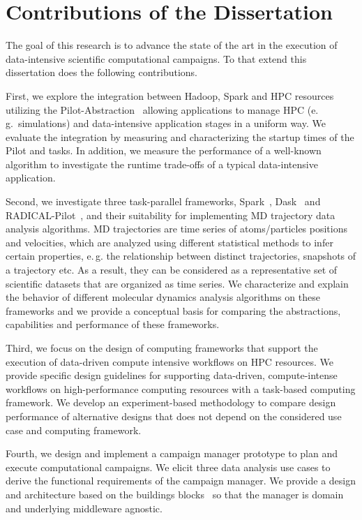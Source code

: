 \section{Contributions of the Dissertation}
The goal of this research is to advance the state of the art in the execution of data-intensive scientific computational campaigns.
To that extend this dissertation does the following contributions.

First, we explore the integration between Hadoop, Spark and HPC resources utilizing the Pilot-Abstraction~\cite{luckow2012pstar} allowing applications to manage HPC (e.\,g.\ simulations) and data-intensive application stages in a uniform way.
We evaluate the integration by measuring and characterizing the startup times of the Pilot and tasks.
In addition, we measure the performance of a well-known  algorithm to investigate the runtime trade-offs of a typical data-intensive application.

Second, we investigate three task-parallel frameworks, Spark~\cite{zaharia2010spark}, Dask~\cite{rocklin2015dask} and RADICAL-Pilot~\cite{merzky2019using}, and their suitability for implementing MD trajectory data analysis algorithms.
MD trajectories are time series of atoms/particles positions and velocities, which are analyzed using different statistical methods to infer certain properties, e.\,g. the relationship between distinct trajectories, snapshots of a trajectory etc.
As a result, they can be considered as a representative set of scientific datasets that are organized as time series. 
We characterize and explain the behavior of different molecular dynamics analysis algorithms on these frameworks and we provide a conceptual basis for comparing the abstractions, capabilities and performance of these frameworks.

Third, we focus on the design of computing frameworks that support the execution of data-driven compute intensive workflows on HPC resources.
We provide specific design guidelines for supporting data-driven, compute-intense workflows on high-performance computing resources with a task-based computing framework.
We develop an experiment-based methodology to compare design performance of alternative designs that does not depend on the considered use case and computing framework.

Fourth, we design and implement a campaign manager prototype to plan and execute computational campaigns.
We elicit three data analysis use cases to derive the functional requirements of the campaign manager.
We provide a design and architecture based on the buildings blocks~\cite{turilli2019middleware} so that the manager is domain and underlying middleware agnostic.

